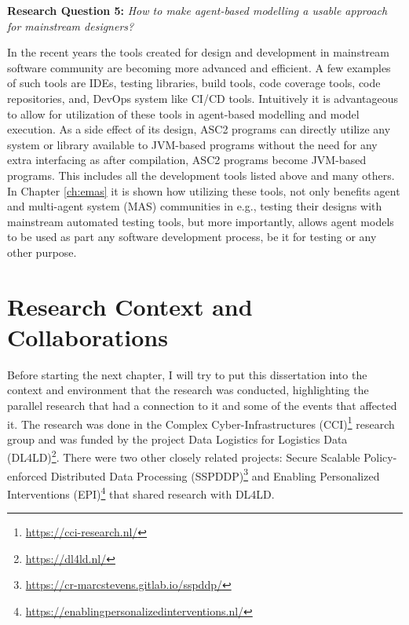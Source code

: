 \begin{displayquote}
\textbf{Research Question 5:} \textit{How to make agent-based modelling a usable approach for mainstream designers?}
\end{displayquote}

In the recent years the tools created for design and development in mainstream software community are becoming more advanced and efficient. A few examples of such tools are IDEs, testing libraries, build tools, code coverage tools, code repositories, and, DevOps system like CI/CD tools. Intuitively it is advantageous to allow for utilization of these tools in agent-based modelling and model execution. As a side effect of its design, ASC2 programs can directly utilize any system or library available to JVM-based programs without the need for any extra interfacing as after compilation, ASC2 programs become JVM-based programs. This includes all the development tools listed above and many others. In Chapter \ref{ch:emas} it is shown how utilizing these tools, not only benefits agent and multi-agent system (MAS) communities in e.g., testing their designs with mainstream automated testing tools, but more importantly, allows agent models to be used as part any software development process, be it for testing or any other purpose.


\section{Research Context and Collaborations}
Before starting the next chapter, I will try to put this dissertation into the context and environment that the research was conducted, highlighting the parallel research that had a connection to it and some of the events that affected it. The research was done in the Complex Cyber-Infrastructures (CCI)\footnote{\url{https://cci-research.nl/}} research group and was funded by the project Data Logistics for Logistics Data (DL4LD)\footnote{\url{https://dl4ld.nl/}}. There were two other closely related projects: Secure Scalable Policy-enforced Distributed Data Processing (SSPDDP)\footnote{\url{https://cr-marcstevens.gitlab.io/sspddp/}} and Enabling Personalized Interventions (EPI)\footnote{\url{https://enablingpersonalizedinterventions.nl/}} that shared research with DL4LD.

